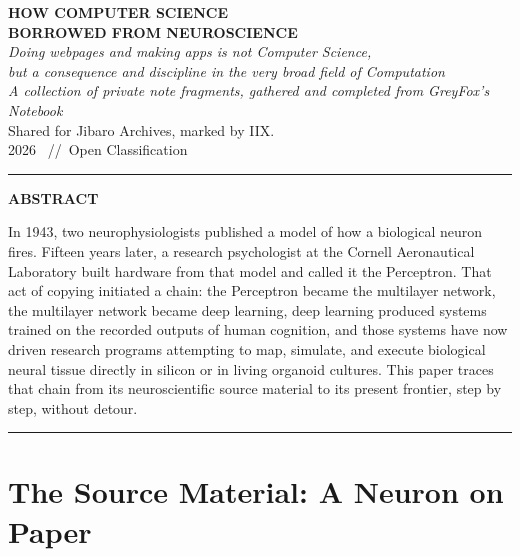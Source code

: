 \documentclass[11pt,a4paper]{article}
\begin{document}
\begin{center}
{\LARGE\bfseries HOW COMPUTER SCIENCE\\[0.3em]BORROWED FROM NEUROSCIENCE}\\[1.0em]
{\itshape\large Doing webpages and making apps is not Computer Science,\\
but a consequence and discipline in the very broad field of Computation}\\[1.2em]
{\itshape A collection of private note fragments, gathered and completed from GreyFox's Notebook}\\[0.3em]
Shared for Jibaro Archives, marked by IIX.\\[0.2em]
{\small\color{gray!60!black} 2026 \ //\ Open Classification}
\end{center}

\vspace{0.5em}
\noindent\rule{\textwidth}{1.2pt}
\vspace{0.4em}

\begin{center}
\textbf{\large ABSTRACT}
\end{center}

In 1943, two neurophysiologists published a model of how a biological neuron fires. Fifteen years later, a research psychologist at the Cornell Aeronautical Laboratory built hardware from that model and called it the Perceptron. That act of copying initiated a chain: the Perceptron became the multilayer network, the multilayer network became deep learning, deep learning produced systems trained on the recorded outputs of human cognition, and those systems have now driven research programs attempting to map, simulate, and execute biological neural tissue directly in silicon or in living organoid cultures. This paper traces that chain from its neuroscientific source material to its present frontier, step by step, without detour.

\vspace{0.4em}
\noindent\rule{\textwidth}{0.4pt}

\section{The Source Material: A Neuron on Paper}
\end{document}
